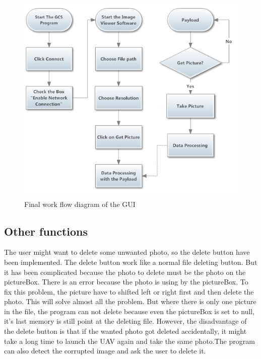 \begin{figure}[H]
\begin{center}
\includegraphics[scale=1]{figures/finalWorkFlow.png} 
\end{center}
\caption{Final work flow diagram of the GUI\label{GUI_finalWorkFlow}}
\end{figure}

\subsection{Other functions}
The user might want to delete some unwanted photo, so the delete button have been implemented. The delete button work like a normal file deleting button. But it has been complicated because the photo to delete must be the photo on the pictureBox. There is an error because the photo is using by the pictureBox. To fix this problem, the picture have to shifted left or right first and then delete the photo. This will solve almost all the problem. But where there is only one picture in the file, the program can not delete because even the pictureBox is set to null, it's last memory is still point at the deleting file. However, the disadvantage of the delete button is that if the wanted photo got deleted accidentally, it might take a long time to launch the UAV again and take the same photo.The program can also detect the corrupted image and ask the user to delete it.


